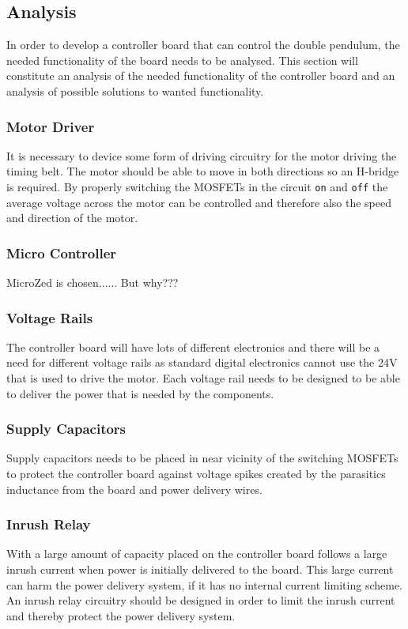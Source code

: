 \subsection{Analysis}
\label{sub:controller_board_analysis}

In order to develop a controller board that can control the double pendulum, the needed functionality of the board needs to be analysed. 
This section will constitute an analysis of the needed functionality of the controller board and an analysis of possible solutions to wanted functionality.


\subsubsection{Motor Driver}
It is necessary to device some form of driving circuitry for the motor driving the timing belt.
The motor should be able to move in both directions so an H-bridge is required.
By properly switching the MOSFETs in the circuit \texttt{on} and \texttt{off} the average voltage across the motor can be controlled and therefore also the speed and direction of the motor.


\subsubsection{Micro Controller}
MicroZed is chosen...... But why???

\subsubsection{Voltage Rails}
The controller board will have lots of different electronics and there will be a need for different voltage rails as standard digital electronics cannot use the 24V that is used to drive the motor.
Each voltage rail needs to be designed to be able to deliver the power that is needed by the components.

\subsubsection{Supply Capacitors}
Supply capacitors needs to be placed in near vicinity of the switching MOSFETs to protect the controller board against voltage spikes created by the parasitics inductance from the board and power delivery wires.

\subsubsection{Inrush Relay}
With a large amount of capacity placed on the controller board follows a large inrush current when power is initially delivered to the board. 
This large current can harm the power delivery system, if it has no internal current limiting scheme.
An inrush relay circuitry should be designed in order to limit the inrush current and thereby protect the power delivery system.

